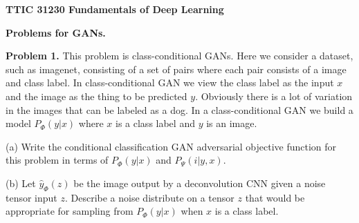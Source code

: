 \documentclass{article}
\begin{document}
\centerline{\bf TTIC 31230 Fundamentals of Deep Learning}

\bigskip

\centerline{\bf Problems for GANs.}

\bigskip
\bigskip
{\bf Problem 1.} This problem is class-conditional GANs.  Here we consider a dataset, such as imagenet, consisting of a set of pairs where each pair
consists of a image and class label.  In class-conditional GAN we view the class label as the input $x$ and the image as the thing to be predicted $y$.
Obviously there is a lot of variation in the images that can be labeled as a dog.  In a class-conditional GAN we build a model $P_\Phi(y|x)$ where $x$ is a class
label and $y$ is an image.

\medskip
(a) Write the conditional classification GAN adversarial objective function for this problem in terms of $P_\Phi(y|x)$ and $P_\Psi(i|y,x)$.

\medskip
(b) Let $\hat{y}_\Phi(z)$ be the image output by a deconvolution CNN given a noise tensor input $z$.  Describe a noise distribute on a
tensor $z$ that would be appropriate for
sampling from $P_\Phi(y|x)$ when $x$ is a class label.
\end{document}
